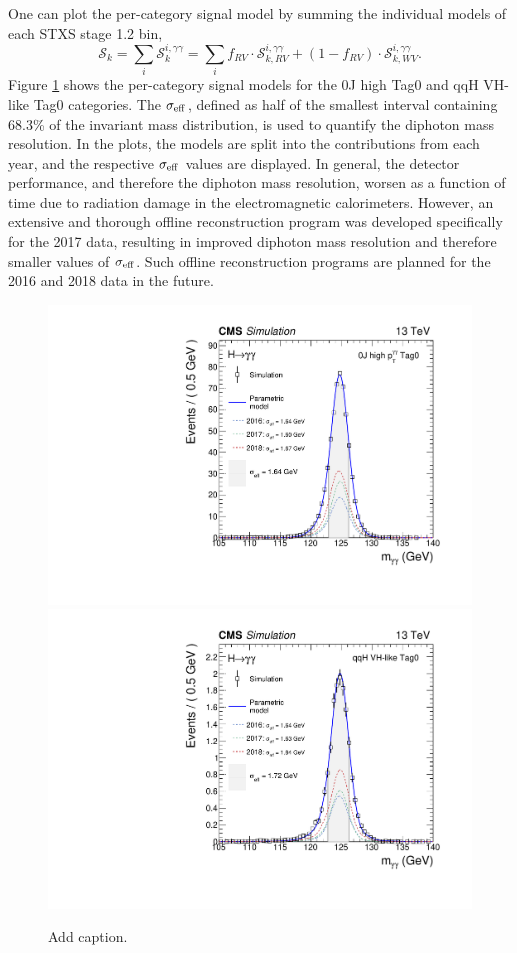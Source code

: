 One can plot the per-category signal model by summing the individual models of each STXS stage 1.2 bin,
\begin{equation}
    \mathcal{S}_k = \sum_i \mathcal{S}^{i,\gamma\gamma}_k = \sum_i f_{RV} \cdot \mathcal{S}^{i,\gamma\gamma}_{k,RV} + (1-f_{RV}) \cdot\mathcal{S}^{i,\gamma\gamma}_{k,WV}.
\end{equation}
\noindent
Figure \ref{fig:sigmodels_category} shows the per-category signal models for the 0J high \ptH Tag0 and qqH VH-like Tag0 categories. The $\sigma_{\rm{eff}}$, defined as half of the smallest interval containing 68.3\% of the invariant mass distribution, is used to quantify the diphoton mass resolution. In the plots, the models are split into the contributions from each year, and the respective $\sigma_{\rm{eff}}$ values are displayed. In general, the detector performance, and therefore the diphoton mass resolution, worsen as a function of time due to radiation damage in the electromagnetic calorimeters. However, an extensive and thorough offline reconstruction program was developed specifically for the 2017 data, resulting in improved diphoton mass resolution and therefore smaller values of $\sigma_{\rm{eff}}$. Such offline reconstruction programs are planned for the 2016 and 2018 data in the future. 

\begin{figure}[hptb]
  \centering
  \includegraphics[width=.49\textwidth]{Figures/hgg_stats/smodel_RECO_0J_PTH_GT10_Tag0.pdf}
  \hfill
  \includegraphics[width=.49\textwidth]{Figures/hgg_stats/smodel_RECO_VBFTOPO_VHHAD_Tag0.pdf}
  \caption[Signal models for the 0J low \ptH Tag0 and qqH VH-like Tag0 categories]
  {
    Add caption.
  }
  \label{fig:sigmodels_category}
\end{figure}

